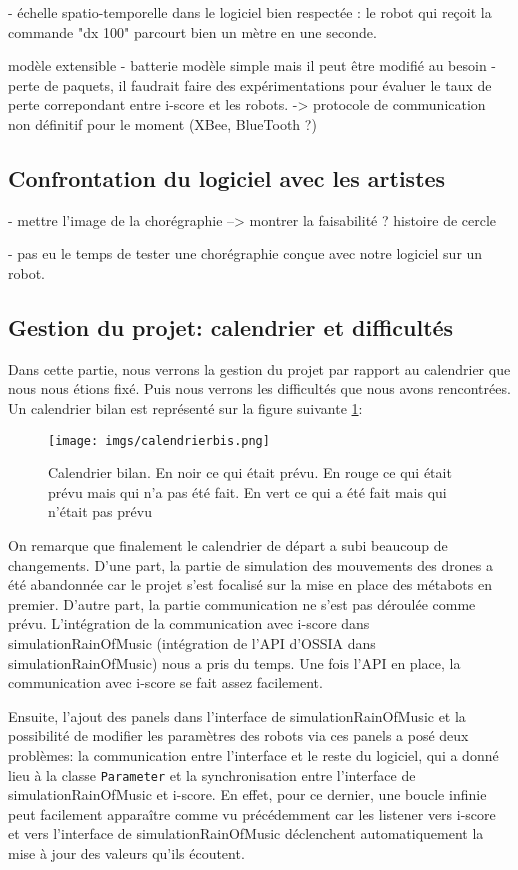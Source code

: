- échelle spatio-temporelle dans le logiciel bien respectée : le robot qui reçoit la commande "dx 100" parcourt bien un mètre en une seconde.

modèle extensible
- batterie modèle simple mais il peut être modifié au besoin
- perte de paquets, il faudrait faire des expérimentations pour évaluer le taux de perte correpondant entre i-score et les robots. -> protocole de communication non définitif pour le moment (XBee, BlueTooth ?)

\subsection{Confrontation du logiciel avec les artistes}

- mettre l'image de la chorégraphie
--> montrer la faisabilité ? histoire de cercle 

- pas eu le temps de tester une chorégraphie conçue avec notre logiciel sur un robot.


\subsection{Gestion du projet: calendrier et difficultés}

Dans cette partie, nous verrons la gestion du projet par rapport au calendrier que nous nous étions fixé. Puis nous verrons les difficultés que nous avons rencontrées. Un calendrier bilan est représenté sur la figure suivante \ref{cal}:

\begin{figure}[H]
  \begin{center}
  	\texttt{[image: imgs/calendrierbis.png]}
  	\caption{Calendrier bilan. En noir ce qui était prévu. En rouge ce qui était prévu mais qui n'a pas été fait. En vert ce qui a été fait mais qui n'était pas prévu}
  	\label{cal}
  \end{center}
\end{figure}

On remarque que finalement le calendrier de départ a subi beaucoup de changements. D'une part, la partie de simulation des mouvements des drones a été abandonnée car le projet s'est focalisé sur la mise en place des métabots en premier. D'autre part, la partie communication ne s'est pas déroulée comme prévu. L'intégration de la communication avec i-score dans simulationRainOfMusic (intégration de l'API d'OSSIA dans simulationRainOfMusic) nous a pris du temps. Une fois l'API en place, la communication avec i-score se fait assez facilement. 

Ensuite, l'ajout des panels dans l'interface de simulationRainOfMusic et la possibilité de modifier les paramètres des robots via ces panels a posé deux problèmes: la communication entre l'interface et le reste du logiciel, qui a donné lieu à la classe \verb|Parameter| et la synchronisation entre l'interface de simulationRainOfMusic et i-score. En effet, pour ce dernier, une boucle infinie peut facilement apparaître comme vu précédemment car les listener vers i-score et vers l'interface de simulationRainOfMusic déclenchent automatiquement la mise à jour des valeurs qu'ils écoutent. 

